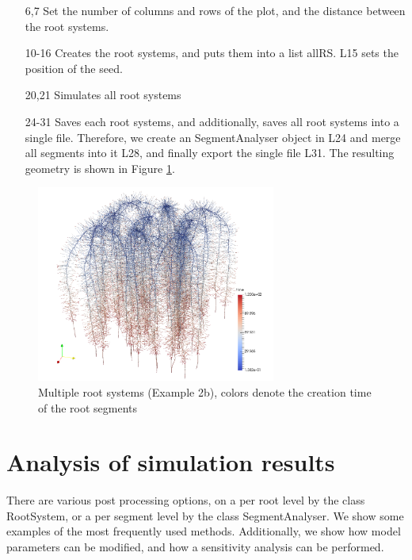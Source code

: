 \documentclass[a4paper]{article}
\begin{document}
\begin{itemize}

\item[6,7] Set the number of columns and rows of the plot, and the distance between the root systems.

\item[10-16] Creates the root systems, and puts them into a list allRS. L15 sets the position of the seed. 

\item[20,21] Simulates all root systems 

\item[24-31] Saves each root systems, and additionally, saves all root systems into a single file. 
Therefore, we create an SegmentAnalyser object in L24 and merge all segments into it L28, and finally export the single file L31. The resulting geometry is shown in Figure \ref{fig:multiple}.

\end{itemize}

\begin{figure}
\centering
\includegraphics[width=0.7\textwidth]{example_2b.png}
\caption{Multiple root systems (Example 2b), colors denote the creation time of the root segments} \label{fig:multiple}
\end{figure}



\section{Analysis of simulation results}

There are various post processing options, on a per root level by the class RootSystem, or a per segment level by the class SegmentAnalyser.
We show some examples of the most frequently used methods. Additionally, we show how model parameters can be modified, 
and how a sensitivity analysis can be performed. 
\end{document}
